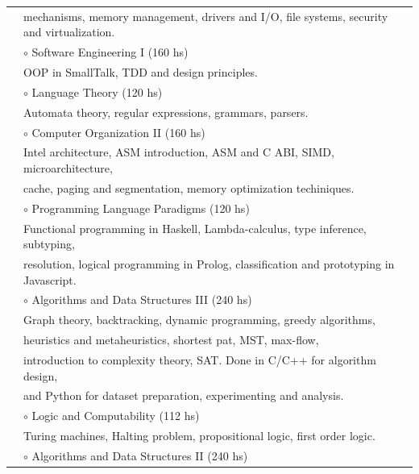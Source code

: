\documentclass{article}
\newcommand{\shade}[1]{\textcolor{myGray}{#1}}
\begin{document}
\begin{longtable}{l l}
                    & \indent \shade{mechanisms, memory management, drivers and I/O, file systems, security and virtualization.} \\
                    & $\circ$ Software Engineering I \shade{(160 hs)} \\
                    & \indent \shade{OOP in SmallTalk, TDD and design principles.} \\
                    & $\circ$ Language Theory \shade{(120 hs)} \\
                    & \indent \shade{Automata theory, regular expressions, grammars, parsers.} \\
                    & $\circ$ Computer Organization II \shade{(160 hs)} \\
                    & \indent \shade{Intel architecture, ASM introduction, ASM and C ABI, SIMD, microarchitecture,} \\
                    & \indent \shade{cache, paging and segmentation, memory optimization techiniques.} \\
                    & $\circ$ Programming Language Paradigms \shade{(120 hs)} \\
                    & \indent \shade{Functional programming in Haskell, Lambda-calculus, type inference, subtyping,}  \\
                    & \indent \shade{resolution, logical programming in Prolog, classification and prototyping in Javascript.} \\
                    & $\circ$ Algorithms and Data Structures III \shade{(240 hs)} \\
                    & \indent \shade{Graph theory, backtracking, dynamic programming, greedy algorithms,} \\
                    & \indent \shade{heuristics and metaheuristics, shortest pat, MST, max-flow,} \\
                    & \indent \shade{introduction to complexity theory, SAT. Done in C/C++ for algorithm design,} \\
                    & \indent \shade{and Python for dataset preparation, experimenting and analysis.} \\
                    & $\circ$ Logic and Computability \shade{(112 hs)} \\
                    & \indent \shade{Turing machines, Halting problem, propositional logic, first order logic.} \\
                    & $\circ$ Algorithms and Data Structures II \shade{(240 hs)} \\

\end{longtable}
\end{document}
